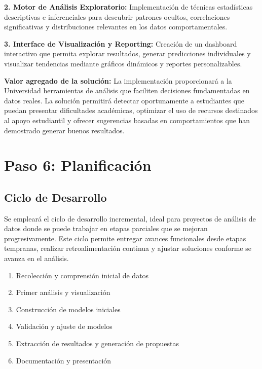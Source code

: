 \documentclass[12pt,letterpaper]{report}
\begin{document}
\textbf{2. Motor de Análisis Exploratorio:} Implementación de técnicas estadísticas descriptivas e inferenciales para descubrir patrones ocultos, correlaciones significativas y distribuciones relevantes en los datos comportamentales.
\vspace{0.3cm}

\textbf{3. Interface de Visualización y Reporting:} Creación de un dashboard interactivo que permita explorar resultados, generar predicciones individuales y visualizar tendencias mediante gráficos dinámicos y reportes personalizables.
\vspace{0.3cm}

\textbf{Valor agregado de la solución:} La implementación proporcionará a la Universidad herramientas de análisis que faciliten decisiones fundamentadas en datos reales. 
La solución permitirá detectar oportunamente a estudiantes que puedan presentar dificultades académicas, optimizar el uso de recursos destinados al apoyo estudiantil y 
ofrecer sugerencias basadas en comportamientos que han demostrado generar buenos resultados.


\section{Paso 6: Planificación}

\subsection{Ciclo de Desarrollo}
Se empleará el ciclo de desarrollo incremental, ideal para proyectos de análisis de datos donde se puede trabajar en etapas parciales que se mejoran progresivamente. Este ciclo permite entregar avances funcionales desde etapas tempranas, realizar retroalimentación continua y ajustar soluciones conforme se avanza en el análisis.
\begin{enumerate}
    \item Recolección y comprensión inicial de datos
    \item Primer análisis y visualización
    \item Construcción de modelos iniciales
    \item Validación y ajuste de modelos
    \item Extracción de resultados y generación de propuestas
    \item Documentación y presentación
\end{enumerate}
\end{document}
